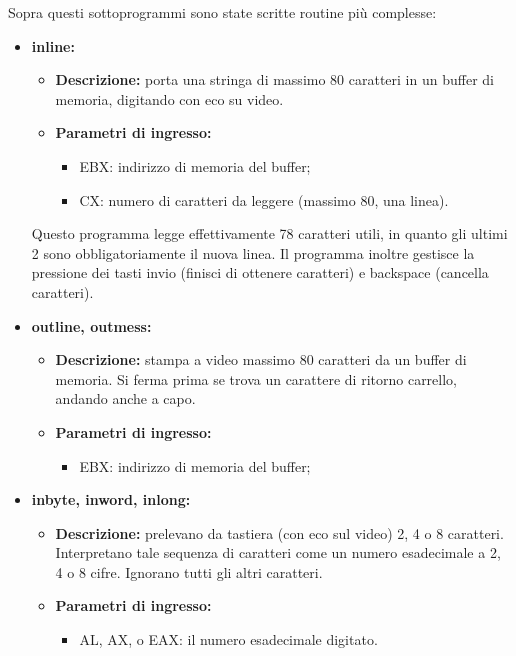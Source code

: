 \documentclass[a4paper,11pt]{article}
\begin{document}
Sopra questi sottoprogrammi sono state scritte routine più complesse:
\begin{itemize}
	
	\item \textbf{inline:} 
	\begin{itemize}
		\item \textbf{Descrizione:} porta una stringa di massimo 80 caratteri in un buffer di memoria, digitando con eco su video.
		\item \textbf{Parametri di ingresso:} 
			\begin{itemize}
				\item EBX: indirizzo di memoria del buffer;
				\item CX: numero di caratteri da leggere (massimo 80, una linea).
			\end{itemize}
	\end{itemize}
		Questo programma legge effettivamente 78 caratteri utili, in quanto gli ultimi 2 sono obbligatoriamente il nuova linea.
		Il programma inoltre gestisce la pressione dei tasti invio (finisci di ottenere caratteri) e backspace (cancella caratteri).
	
	\item \textbf{outline, outmess:}
		\begin{itemize}
		\item \textbf{Descrizione:} stampa a video massimo 80 caratteri da un buffer di memoria. Si ferma prima se trova un carattere di ritorno carrello, andando anche a capo. 
		\item \textbf{Parametri di ingresso:} 
			\begin{itemize}
				\item EBX: indirizzo di memoria del buffer;
			\end{itemize}
		\end{itemize}
		
	\item \textbf{inbyte, inword, inlong:}
		\begin{itemize}
		\item \textbf{Descrizione:} prelevano da tastiera (con eco sul video) 2, 4 o 8 caratteri.
			Interpretano tale sequenza di caratteri come un numero esadecimale a 2, 4 o 8 cifre.
			Ignorano tutti gli altri caratteri.
		\item \textbf{Parametri di ingresso:} 
			\begin{itemize}
				\item AL, AX, o EAX: il numero esadecimale digitato.
			\end{itemize}
		\end{itemize}


\end{itemize}
\end{document}
